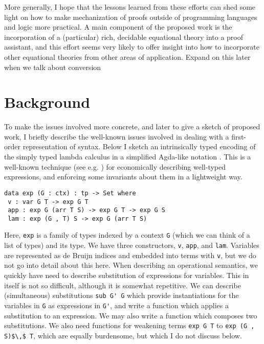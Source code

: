 \documentclass{article}
\newcommand{\LONGVERSION}[1]{{\color{light-gray}#1}}
\begin{document}
More generally, I hope that the lessons learned from these efforts can shed some light on how
to make mechanization of proofs outside of programming languages and
logic more practical. A main component of the proposed work is the
incorporation of a (particular) rich, decidable equational theory into a
proof assistant, and this effort seems very likely to offer insight into how to
incorporate other equational theories from other areas of
application. \LONGVERSION{Expand on this later when we talk about conversion}

\section{Background}\label{sec:background}
To make the issues involved more concrete, and later to give a sketch
of proposed work, I briefly describe the
well-known issues involved in dealing with a first-order representation of
syntax. Below I sketch an intrinsically typed encoding of the
simply typed lambda calculus in a simplified Agda-like notation \citep{Norell:phd07}. This
is a well-known technique (see e.g. \citep{Benton:12}) for
economically describing well-typed expressions, and enforcing some
invariants about them in a lightweight way.

\begin{verbatim}
data exp (G : ctx) : tp -> Set where
 v : var G T -> exp G T
 app : exp G (arr T S) -> exp G T -> exp G S
 lam : exp (G , T) S -> exp G (arr T S)
\end{verbatim}

Here, \lstinline{exp} is a family of types indexed by  a context
\lstinline{G} (which we can think of a list of types) and its
type. We have three constructors, \lstinline{v}, \lstinline{app}, and
\lstinline{lam}. Variables are represented as de Bruijn indices and
embedded into terms with \lstinline{v}, but we do
not go into detail about this here. When describing an operational
semantics, we quickly have need to describe substitution of
expressions for variables. This in itself is not so difficult,
although it is somewhat repetitive. We can
describe (simultaneous) substitutions \lstinline{sub G' G} which provide
instantiations for the variables in \lstinline{G} as expressions in
\lstinline{G'}, and write a function which applies a substitution to
an expression. We may also write a function which composes two
substitutions. We also need functions for weakening terms
\lstinline{exp G T} to \lstinline{exp (G , S)$\,$ T}, which are equally
burdensome, but which I do not discuss below.
\end{document}
